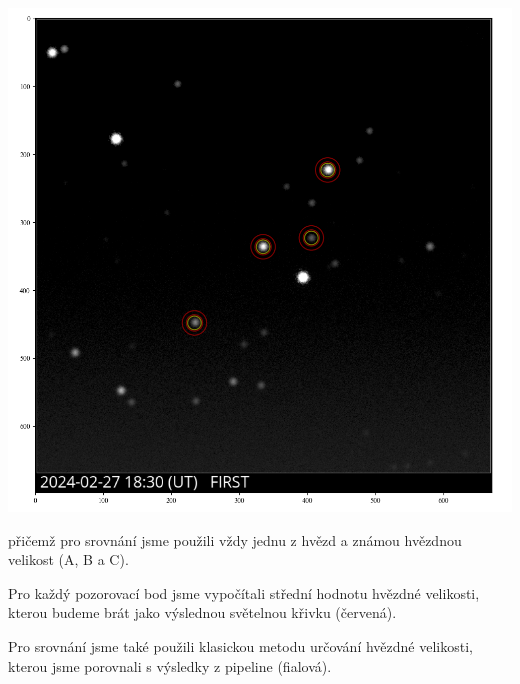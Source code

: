 \documentclass[a4paper,11pt]{article}
\begin{document}
    \begin{minipage}[t]{0.5\textwidth}
                \vspace{10pt}   
                \par \centering
                \includegraphics[scale=0.32]{apertures}
                \captionsetup{justification=centering, font=footnotesize}
                \label{fig:apert}
                \vspace{10pt}
                \raggedright 

                přičemž pro srovnání jsme použili vždy jednu z hvězd a známou hvězdnou velikost (A, B a C). 
                \par Pro každý pozorovací bod jsme vypočítali střední hodnotu hvězdné velikosti, kterou budeme brát jako výslednou světelnou křivku (červená).
                \par Pro srovnání jsme také použili klasickou metodu určování hvězdné velikosti, kterou jsme porovnali s výsledky z pipeline (fialová).


\end{minipage}
\end{document}
